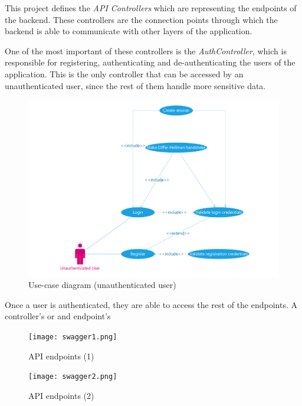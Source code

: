 This project defines the \emph{API Controllers} which are representing the endpoints of the backend.
These controllers are the connection points through which the backend is able to communicate with other layers of the application.

One of the most important of these controllers is the \emph{AuthController}, which is responsible for 
registering, authenticating and de-authenticating the users of the application.
This is the only controller that can be accessed by an unauthenticated user, since the rest of them handle more 
sensitive data.

\begin{figure}[H]
	\centering
	\includegraphics[scale=0.50]{use-case-diagram-unauth}
	\caption{Use-case diagram (unauthenticated user)}
\end{figure}

Once a user is authenticated, they are able to access the rest of the endpoints.
A controller's or and endpoint's 

\begin{figure}[H]
	\centering
	\texttt{[image: swagger1.png]}
	\caption{API endpoints (1)}
\end{figure}

\begin{figure}[H]
	\centering
	\texttt{[image: swagger2.png]}
	\caption{API endpoints (2)}
\end{figure}



